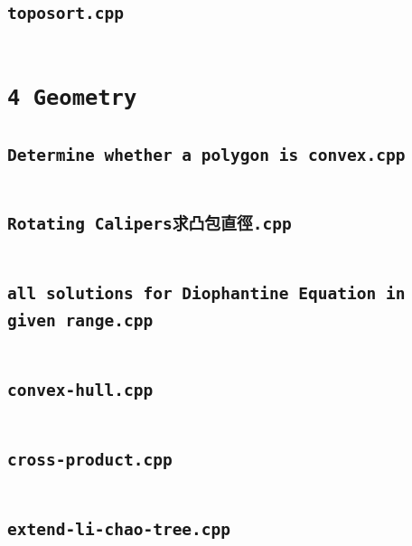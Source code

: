 \subsection*{\texttt{toposort.cpp}} \label{sec:3_3_Graph_file14}
\inputminted[fontsize=\footnotesize, linenos, breaklines]{cpp}{./3\ Graph/toposort.cpp}

\section*{\texttt{4 Geometry}} \label{sec:4_4_Geometry}
\subsection*{\texttt{Determine whether a polygon is convex.cpp}} \label{sec:4_4_Geometry_file0}
\inputminted[fontsize=\footnotesize, linenos, breaklines]{cpp}{./4\ Geometry/Determine\ whether\ a\ polygon\ is\ convex.cpp}

\subsection*{\texttt{Rotating Calipers求凸包直徑.cpp}} \label{sec:4_4_Geometry_file1}
\inputminted[fontsize=\footnotesize, linenos, breaklines]{cpp}{./4\ Geometry/Rotating\ Calipers求凸包直徑.cpp}

\subsection*{\texttt{all solutions for Diophantine Equation in given range.cpp}} \label{sec:4_4_Geometry_file2}
\inputminted[fontsize=\footnotesize, linenos, breaklines]{cpp}{./4\ Geometry/all\ solutions\ for\ Diophantine\ Equation\ in\ given\ range.cpp}

\subsection*{\texttt{convex-hull.cpp}} \label{sec:4_4_Geometry_file3}
\inputminted[fontsize=\footnotesize, linenos, breaklines]{cpp}{./4\ Geometry/convex-hull.cpp}

\subsection*{\texttt{cross-product.cpp}} \label{sec:4_4_Geometry_file4}
\inputminted[fontsize=\footnotesize, linenos, breaklines]{cpp}{./4\ Geometry/cross-product.cpp}

\subsection*{\texttt{extend-li-chao-tree.cpp}} \label{sec:4_4_Geometry_file5}
\inputminted[fontsize=\footnotesize, linenos, breaklines]{cpp}{./4\ Geometry/extend-li-chao-tree.cpp}

